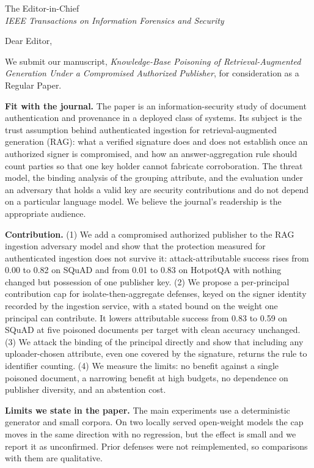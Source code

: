 \documentclass[12pt]{article}
\begin{document}
\noindent The Editor-in-Chief\\
\emph{IEEE Transactions on Information Forensics and Security}

\bigskip

\noindent Dear Editor,

We submit our manuscript, \emph{Knowledge-Base Poisoning of Retrieval-Augmented Generation
Under a Compromised Authorized Publisher}, for consideration as a Regular Paper.

\textbf{Fit with the journal.}
The paper is an information-security study of document authentication and provenance in a
deployed class of systems. Its subject is the trust assumption behind authenticated ingestion
for retrieval-augmented generation (RAG): what a verified signature does and does not
establish once an authorized signer is compromised, and how an answer-aggregation rule should
count parties so that one key holder cannot fabricate corroboration. The threat model,
the binding analysis of the grouping attribute, and the evaluation under an adversary that
holds a valid key are security contributions and do not depend on a particular language model.
We believe the journal's readership is the appropriate audience.

\textbf{Contribution.}
(1) We add a compromised authorized publisher to the RAG ingestion adversary model and show
that the protection measured for authenticated ingestion does not survive it:
attack-attributable success rises from 0.00 to 0.82 on SQuAD and from 0.01 to 0.83 on HotpotQA
with nothing changed but possession of one publisher key.
(2) We propose a per-principal contribution cap for isolate-then-aggregate defenses, keyed on
the signer identity recorded by the ingestion service, with a stated bound on the weight one
principal can contribute. It lowers attributable success from 0.83 to 0.59 on SQuAD at five
poisoned documents per target with clean accuracy unchanged.
(3) We attack the binding of the principal directly and show that including any
uploader-chosen attribute, even one covered by the signature, returns the rule to identifier
counting.
(4) We measure the limits: no benefit against a single poisoned document, a narrowing benefit
at high budgets, no dependence on publisher diversity, and an abstention cost.

\textbf{Limits we state in the paper.}
The main experiments use a deterministic generator and small corpora. On two locally served
open-weight models the cap moves in the same direction with no regression, but the effect is
small and we report it as unconfirmed. Prior defenses were not reimplemented, so comparisons
with them are qualitative.
\end{document}
